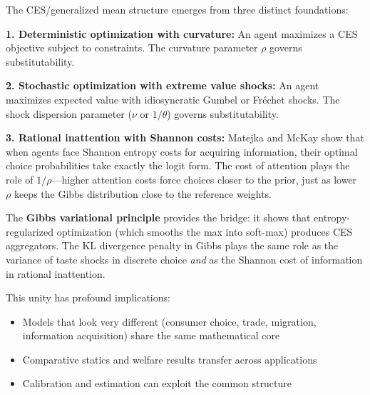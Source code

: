 \begin{calloutimportant}
The CES/generalized mean structure emerges from three distinct foundations:

\textbf{1. Deterministic optimization with curvature:} An agent maximizes a CES objective subject to constraints. The curvature parameter $\rho$ governs substitutability.

\textbf{2. Stochastic optimization with extreme value shocks:} An agent maximizes expected value with idiosyncratic Gumbel or Fréchet shocks. The shock dispersion parameter ($\nu$ or $1/\theta$) governs substitutability.

\textbf{3. Rational inattention with Shannon costs:} Matejka and McKay show that when agents face Shannon entropy costs for acquiring information, their optimal choice probabilities take exactly the logit form. The cost of attention plays the role of $1/\rho$---higher attention costs force choices closer to the prior, just as lower $\rho$ keeps the Gibbs distribution close to the reference weights.

The \textbf{Gibbs variational principle} provides the bridge: it shows that entropy-regularized optimization (which smooths the max into soft-max) produces CES aggregators. The KL divergence penalty in Gibbs plays the same role as the variance of taste shocks in discrete choice \emph{and} as the Shannon cost of information in rational inattention.

This unity has profound implications:
\begin{itemize}[nosep]
    \item Models that look very different (consumer choice, trade, migration, information acquisition) share the same mathematical core
    \item Comparative statics and welfare results transfer across applications
    \item Calibration and estimation can exploit the common structure
\end{itemize}
\end{calloutimportant}

